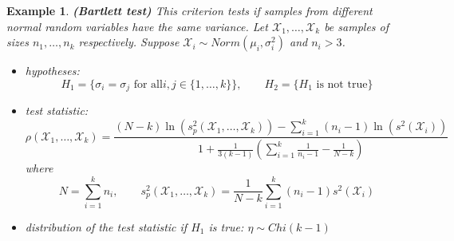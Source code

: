 \documentclass[12pt]{article}
\newtheorem{example}[theorem]{Example}
\begin{document}
\begin{example} \textbf{(Bartlett test)} This criterion tests if samples from
    different normal random variables have the same variance. Let
    $\mathscr{X}_1,\ldots,\mathscr{X}_k$ be samples of sizes $n_1,\ldots,n_k$
    respectively. Suppose $\mathscr{X}_i\sim Norm(\mu_i,\sigma_i^2)$ and
    $n_i>3$.
    \begin{itemize}
        \item hypotheses:
              $$
                  H_1=\{\sigma_i=\sigma_j
                  \mbox{ for all}i,j\in \{1,\ldots,k\} \},
                  \quad\quad H_2=\{H_1\mbox{ is not true}\}
              $$
        \item test statistic:
              $$
                  \rho(\mathscr{X}_1,\ldots,\mathscr{X}_k)
                  =\frac{
                      (N-k)\ln(s_p^2(\mathscr{X}_1,\ldots,\mathscr{X}_k))
                      -\sum_{i=1}^k (n_i-1)\ln(s^2(\mathscr{X}_i))
                  }{
                      1+\frac{1}{3(k-1)}
                      \left(\sum_{i=1}^k \frac{1}{n_i-1}-\frac{1}{N-k}\right)
                  }
              $$
              where
              $$
                  N=\sum_{i=1}^k n_i,
                  \quad\quad
                  s_p^2(\mathscr{X}_1,\ldots,\mathscr{X}_k)
                  =\frac{1}{N-k}\sum_{i=1}^k (n_i-1) s^2(\mathscr{X}_i)
              $$
        \item distribution of the test statistic if $H_1$ is true: $\eta\sim
                  Chi(k-1)$
    \end{itemize}
\end{example}
\end{document}
